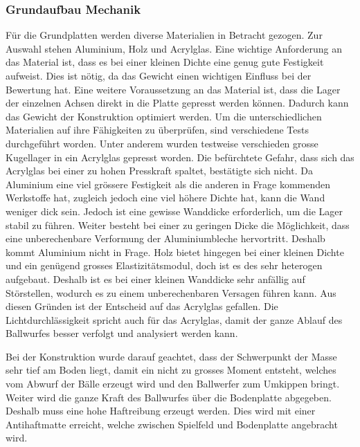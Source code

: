 \subsubsection{Grundaufbau Mechanik}
Für die Grundplatten werden diverse Materialien in Betracht gezogen. Zur Auswahl stehen Aluminium, Holz und Acrylglas. Eine wichtige Anforderung an das Material ist, dass es bei einer kleinen Dichte eine genug gute Festigkeit aufweist. Dies ist nötig, da das Gewicht einen wichtigen Einfluss bei der Bewertung hat. Eine weitere Voraussetzung an das Material ist, dass die Lager der einzelnen Achsen direkt in die Platte gepresst werden können. Dadurch kann das Gewicht der Konstruktion optimiert werden. Um die unterschiedlichen Materialien auf ihre Fähigkeiten zu überprüfen, sind verschiedene Tests durchgeführt worden. Unter anderem wurden testweise verschieden grosse Kugellager in ein Acrylglas gepresst worden. Die befürchtete Gefahr, dass sich das Acrylglas bei einer zu hohen Presskraft spaltet, bestätigte sich nicht. Da Aluminium eine viel grössere Festigkeit als die anderen in Frage kommenden Werkstoffe hat, zugleich jedoch eine viel höhere Dichte hat, kann die Wand weniger dick sein. Jedoch ist eine gewisse Wanddicke erforderlich, um die Lager stabil zu führen. Weiter besteht bei einer zu geringen Dicke die Möglichkeit, dass eine unberechenbare Verformung der Aluminiumbleche hervortritt. Deshalb kommt Aluminium nicht in Frage. Holz bietet hingegen bei einer kleinen Dichte und ein genügend grosses Elastizitätsmodul, doch ist es des sehr heterogen aufgebaut. Deshalb ist es bei einer kleinen Wanddicke sehr anfällig auf Störstellen, wodurch es zu einem unberechenbaren Versagen führen kann. Aus diesen Gründen ist der Entscheid auf das Acrylglas gefallen. Die Lichtdurchlässigkeit spricht auch für das Acrylglas, damit der ganze Ablauf des Ballwurfes besser verfolgt und analysiert werden kann. 

Bei der Konstruktion wurde darauf geachtet, dass der Schwerpunkt der Masse sehr tief am Boden liegt, damit ein nicht zu grosses Moment entsteht, welches vom Abwurf der Bälle erzeugt wird und den Ballwerfer zum Umkippen bringt. Weiter wird die ganze Kraft des Ballwurfes über die Bodenplatte abgegeben. Deshalb muss eine hohe Haftreibung erzeugt werden. Dies wird mit einer Antihaftmatte erreicht, welche zwischen Spielfeld und Bodenplatte angebracht wird.

